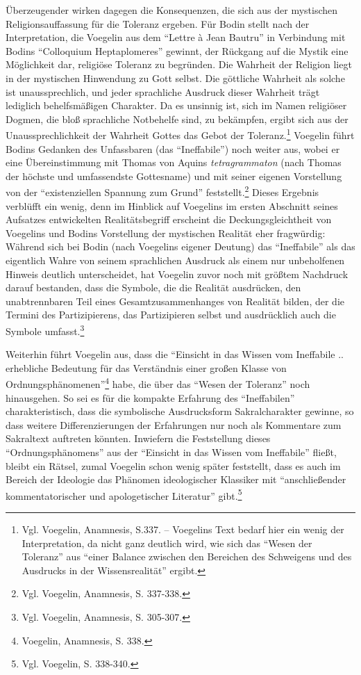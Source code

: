 Überzeugender wirken dagegen die Konsequenzen, die sich aus der mystischen
Religionsauffassung für die Toleranz ergeben. Für Bodin stellt nach der
Interpretation, die Voegelin aus dem "`Lettre à Jean Bautru"' in Verbindung
mit Bodins "`Colloquium Heptaplomeres"' gewinnt, der Rückgang auf die Mystik
eine Möglichkeit dar, religiöse Toleranz zu begründen. Die Wahrheit der
Religion liegt in der mystischen Hinwendung zu Gott selbst. Die göttliche
Wahrheit als solche ist unaussprechlich, und jeder sprachliche Ausdruck dieser
Wahrheit trägt lediglich behelfsmäßigen Charakter. Da es unsinnig ist, sich im
Namen religiöser Dogmen, die bloß sprachliche Notbehelfe sind, zu bekämpfen,
ergibt sich aus der Unaussprechlichkeit der Wahrheit Gottes das Gebot der
Toleranz.\footnote{Vgl. Voegelin, Anamnesis, S.337. -- Voegelins Text bedarf
  hier ein wenig der Interpretation, da nicht ganz deutlich wird, wie sich das
  "`Wesen der Toleranz"' aus "`einer Balance zwischen den Bereichen des
  Schweigens und des Ausdrucks in der Wissensrealität"' ergibt.} Voegelin
führt Bodins Gedanken des Unfassbaren (das "`Ineffabile"') noch weiter aus,
wobei er eine Übereinstimmung mit Thomas von Aquins {\it tetragrammaton} (nach
Thomas der höchste und umfassendste Gottesname) und mit seiner eigenen
Vorstellung von der "`existenziellen Spannung zum Grund"'
feststellt.\footnote{Vgl.  Voegelin, Anamnesis, S. 337-338.} Dieses Ergebnis
verblüfft ein wenig, denn im Hinblick auf Voegelins im ersten Abschnitt seines
Aufsatzes entwickelten Realitätsbegriff erscheint die Deckungsgleichtheit von
Voegelins und Bodins Vorstellung der mystischen Realität eher fragwürdig:
Während sich bei Bodin (nach Voegelins eigener Deutung) das "`Ineffabile"' als
das eigentlich Wahre von seinem sprachlichen Ausdruck als einem nur
unbeholfenen Hinweis deutlich unterscheidet, hat Voegelin zuvor noch mit
größtem Nachdruck darauf bestanden, dass die Symbole, die die Realität
ausdrücken, den unabtrennbaren Teil eines Gesamtzusammenhanges von Realität
bilden, der die Termini des Partizipierens, das Partizipieren selbst und
ausdrücklich auch die Symbole umfasst.\footnote{Vgl. Voegelin, Anamnesis,
  S. 305-307.} 

Weiterhin führt Voegelin aus, dass die "`Einsicht in das Wissen vom Ineffabile
.. erhebliche Bedeutung für das Verständnis einer großen Klasse von
Ordnungsphänomenen"'\footnote{Voegelin, Anamnesis, S. 338.} habe, die über das
"`Wesen der Toleranz"' noch hinausgehen. So sei es für die kompakte Erfahrung
des "`Ineffabilen"' charakteristisch, dass die symbolische Ausdrucksform
Sakralcharakter gewinne, so dass weitere Differenzierungen der Erfahrungen nur
noch als Kommentare zum Sakraltext auftreten könnten. Inwiefern die
Feststellung dieses "`Ordnungsphänomens"' aus der "`Einsicht in das Wissen vom
Ineffabile"' fließt, bleibt ein Rätsel, zumal Voegelin schon
wenig später feststellt, dass es auch im Bereich der Ideologie das Phänomen
ideologischer Klassiker mit "`anschließender kommentatorischer und
apologetischer Literatur"' gibt.\footnote{Vgl. Voegelin, S. 338-340.}

